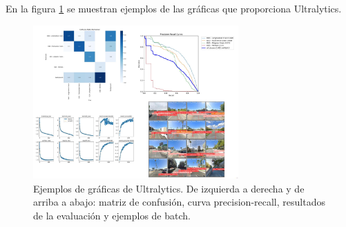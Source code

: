 En la figura \ref{fig:Ultralytics_metrics} se muestran ejemplos de las gráficas que proporciona Ultralytics.

\begin{figure}[H]
    \centering
    \includegraphics[width=0.7\textwidth]{graphs/metrics_grid.jpg}
    \caption{Ejemplos de gráficas de Ultralytics. De izquierda a derecha y de arriba a abajo: matriz de confusión, curva precision-recall, resultados de la evaluación y ejemplos de batch.}
    \label{fig:Ultralytics_metrics}
\end{figure}

